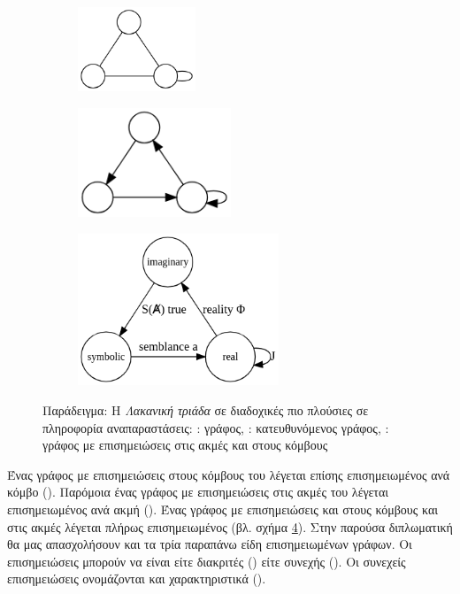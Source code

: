 \begin{figure}[ht]%
\centering
  \begin{subfigure}[α]{0.33\linewidth}
    \centering\includegraphics[width=100pt]{figures/lacan_a}
    \caption{\label{lac:a}}
  \end{subfigure}%
  \begin{subfigure}[β]{0.33\linewidth}
    \centering\includegraphics[width=130pt]{figures/lacan_b}
    \caption{\label{lac:b}}
  \end{subfigure}
  \begin{subfigure}[γ]{0.33\linewidth}
  \centering\includegraphics[width=170pt]{figures/lacan_c}
  \caption{\label{lac:c}}
  \end{subfigure}

  \caption[Παραδείγμα γράφου σε διαδοχικές πιο πλούσιες σε πληροφορία αναπαραστάσεις]{Παράδειγμα: H \textit{Λακανική τριάδα} σε διαδοχικές πιο πλούσιες σε πληροφορία αναπαραστάσεις: : γράφος, : κατευθυνόμενος γράφος, : γράφος με επισημειώσεις στις ακμές και στους κόμβους}
\label{lac}
\end{figure}

Ένας γράφος με επισημειώσεις στους κόμβους του λέγεται επίσης επισημειωμένος ανά κόμβο ().
Παρόμοια ένας γράφος με επισημειώσεις στις ακμές του λέγεται επισημειωμένος ανά ακμή ().
Ένας γράφος με επισημειώσεις και στους κόμβους και στις ακμές λέγεται πλήρως επισημειωμένος (βλ. σχήμα \ref{lac}).
Στην παρούσα διπλωματική θα μας απασχολήσουν και τα τρία παραπάνω είδη επισημειωμένων γράφων. Οι επισημειώσεις μπορούν να είναι είτε διακριτές () είτε συνεχής ().
Οι συνεχείς επισημειώσεις ονομάζονται και χαρακτηριστικά ().

